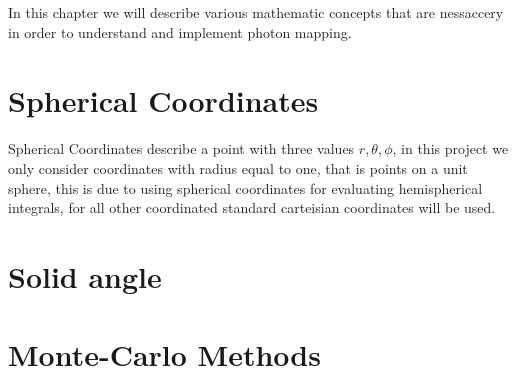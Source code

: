 In this chapter we will describe various mathematic concepts that are nessaccery in order to understand and implement photon mapping.

\section{Spherical Coordinates}
Spherical Coordinates describe a point with three values $r, \theta, \phi$, in this project we only consider coordinates with
radius equal to one, that is points on a unit sphere, this is due to using spherical coordinates for evaluating hemispherical
integrals, for all other coordinated standard carteisian coordinates will be used.


\section{Solid angle}



\section{Monte-Carlo Methods}

